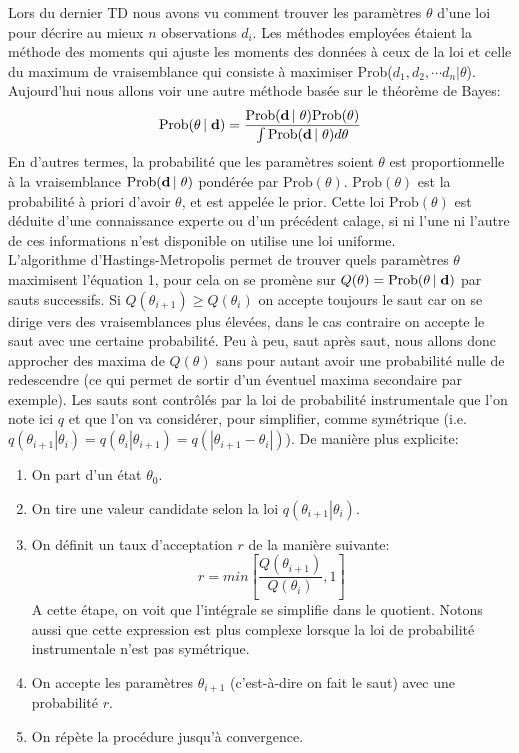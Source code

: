 \documentclass[a4paper]{article}
\begin{document}
 Lors du dernier TD nous avons vu comment trouver les paramètres $\theta$ d'une loi pour décrire au mieux $n$ observations $d_i$. Les méthodes employées étaient la méthode des moments qui ajuste les moments des données à ceux de la loi et celle du maximum de vraisemblance qui consiste à maximiser Prob($d_1, d_2, \cdots d_n \left|\right. \theta$). Aujourd'hui nous allons voir une autre méthode basée sur le théorème de Bayes:
\begin{equation}
		\textrm{Prob}(\theta\left|\right. \bold{d})=\frac{\textrm{Prob}(\bold{d}\left|\right. \theta) \textrm{Prob}(\theta)}{\int  \textrm{Prob}(\bold{d}\left|\right. \theta) d \theta}
\label{eq1}
\end{equation}
En d'autres termes, la probabilité  que les paramètres soient $\theta$ est proportionnelle à la vraisemblance $\textrm{Prob}(\bold{d}\left|\right. \theta)$ pondérée par $\textrm{Prob}(\theta)$. $\textrm{Prob}(\theta)$ est la probabilité à priori d'avoir $\theta$, et est appelée le prior. Cette loi $\textrm{Prob}(\theta)$ est déduite d'une connaissance experte ou d'un précédent calage, si ni l'une ni l'autre de ces informations n'est disponible on utilise une loi uniforme. \\
L'algorithme d'Hastings-Metropolis permet de trouver quels paramètres $\theta$ maximisent l'équation 1, pour cela on se promène sur $Q(\theta)=\textrm{Prob}(\theta \left|\right. \bold{d})$ par sauts successifs. Si $Q(\theta_{i+1}) \geq Q(\theta_{i})$ on accepte toujours le saut car on se dirige vers des vraisemblances plus élevées, dans le cas contraire on accepte le saut avec une certaine probabilité. Peu à peu, saut après saut, nous allons donc approcher des maxima de $Q(\theta)$ sans pour autant avoir une probabilité nulle de redescendre (ce qui permet de sortir d'un éventuel maxima secondaire par exemple). Les sauts sont contrôlés par la loi de probabilité instrumentale que l'on note ici $q$ et que l'on va considérer, pour simplifier, comme symétrique (i.e. $q(\theta_{i+1}\left|\right.\theta_i)=q(\theta_i\left|\right.\theta_{i+1})=q(\left|\theta_{i+1}-\theta_i\right|)$). De manière plus explicite:
\begin{enumerate}
	\item On part d'un état $\theta_0$.
    \item On tire une valeur candidate selon la loi $q(\theta_{i+1}\left|\right.\theta_i)$.
	\item On définit un taux d'acceptation $r$ de la manière suivante:
	\[
	r=min\left[\frac{Q(\theta_{i+1})}{Q(\theta_{i})},1\right]
	\]
    A cette étape, on voit que l'intégrale se simplifie dans le quotient. Notons aussi que cette expression est plus complexe lorsque la loi de probabilité instrumentale n'est pas symétrique.
	\item On accepte les paramètres $\theta_{i+1}$ (c'est-à-dire on fait le saut) avec une probabilité $r$.
	\item On répète la procédure jusqu'à convergence.
\end{enumerate}
\end{document}
